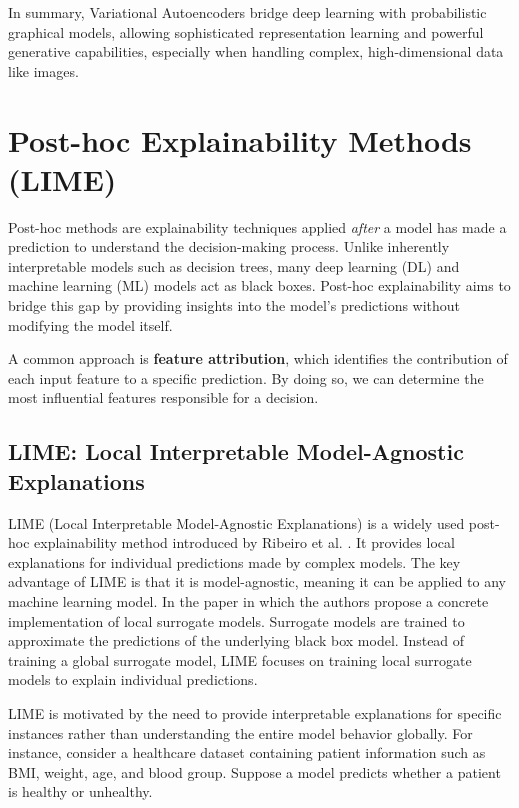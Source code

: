 In summary, Variational Autoencoders bridge deep learning with probabilistic graphical models, allowing sophisticated representation learning and powerful generative capabilities, especially when handling complex, high-dimensional data like images.


















\section{Post-hoc Explainability Methods (LIME)}

Post-hoc methods are explainability techniques applied \textit{after} a model has made a prediction to understand the decision-making process. Unlike inherently interpretable models such as decision trees, many deep learning (DL) and machine learning (ML) models act as black boxes. Post-hoc explainability aims to bridge this gap by providing insights into the model’s predictions without modifying the model itself.

A common approach is \textbf{feature attribution}, which identifies the contribution of each input feature to a specific prediction. By doing so, we can determine the most influential features responsible for a decision.

\subsection{LIME: Local Interpretable Model-Agnostic Explanations}

LIME (Local Interpretable Model-Agnostic Explanations) is a widely used post-hoc explainability method introduced by Ribeiro et al. \cite{Ribeiro2018}. It provides local explanations for individual predictions made by complex models. The key advantage of LIME is that it is model-agnostic, meaning it can be applied to any machine learning model. In the paper \cite{ribeiro2016ML} in which the authors propose a concrete implementation of local surrogate models. Surrogate models are trained to approximate the predictions of the underlying black box model. Instead of training a global surrogate model, LIME focuses on training local surrogate models to explain individual predictions.

LIME is motivated by the need to provide interpretable explanations for specific instances rather than understanding the entire model behavior globally. For instance, consider a healthcare dataset containing patient information such as BMI, weight, age, and blood group. Suppose a model predicts whether a patient is healthy or unhealthy. 

